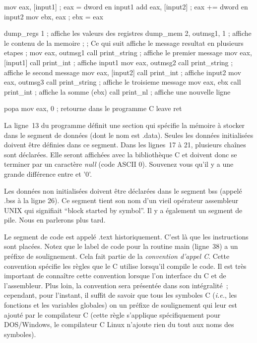 \begin{AsmCodeListing}[label=first.asm]
        mov     eax, [input1]    ; eax = dword en input1
        add     eax, [input2]    ; eax += dword en input2
        mov     ebx, eax         ; ebx = eax

        dump_regs 1              ; affiche les valeurs des registres
        dump_mem  2, outmsg1, 1  ; affiche le contenu de la memoire
;
; Ce qui suit affiche le message resultat en plusieurs etapes
;
        mov     eax, outmsg1
        call    print_string     ; affiche le premier message
        mov     eax, [input1]     
        call    print_int        ; affiche input1
        mov     eax, outmsg2
        call    print_string     ; affiche le second message
        mov     eax, [input2]
        call    print_int        ; affiche input2
        mov     eax, outmsg3
        call    print_string     ; affiche le troisieme message
        mov     eax, ebx
        call    print_int        ; affiche la somme (ebx)
        call    print_nl         ; affiche une nouvelle ligne

        popa
        mov     eax, 0           ; retourne dans le programme C
        leave                     
        ret
\end{AsmCodeListing}

La ligne~13 du programme définit une section qui spécifie
la mémoire à stocker dans le segment de données (dont le nom est
{\code .data}). Seules les données initialisées doivent
être définies dans ce segment. Dans les lignes~17 à 21, plusieurs chaînes
sont déclarées. Elle seront affichées avec la bibliothèque C et doivent donc
se terminer par un caractère \emph{null} (code ASCII 0). Souvenez vous
qu'il y a une grande différence entre {} et {\code '0'}.

Les données non initialisées doivent être déclarées dans le segment bss 
(appelé {\code .bss} à la ligne 26). Ce segment
tient son nom d'un vieil opérateur assembleur UNIX qui signifiait
``block started by symbol''. Il y a également un segment de pile.
Nous en parlerons plus tard.

Le segment de code  est appelé {\code .text}
historiquement. C'est là que les instructions sont placées. Notez que
le label de code pour la routine main (ligne~38) a un préfixe de
soulignement. Cela fait partie de la \emph{convention d'appel C}.
Cette convention spécifie les règles que le C utilise lorsqu'il
compile le code. Il est très important de connaître cette convention
lorsque l'on interface du C et de l'assembleur. Plus loin, la convention
sera présentée dans son intégralité~; cependant, pour l'instant, il suffit
de savoir que tous les symboles C ({\em i.e.}, les fonctions et les variables
globales) on un préfixe de soulignement qui leur est ajouté par le compilateur
C (cette règle s'applique spécifiquement pour DOS/Windows, le compilateur
C Linux n'ajoute rien du tout aux noms des symboles).


